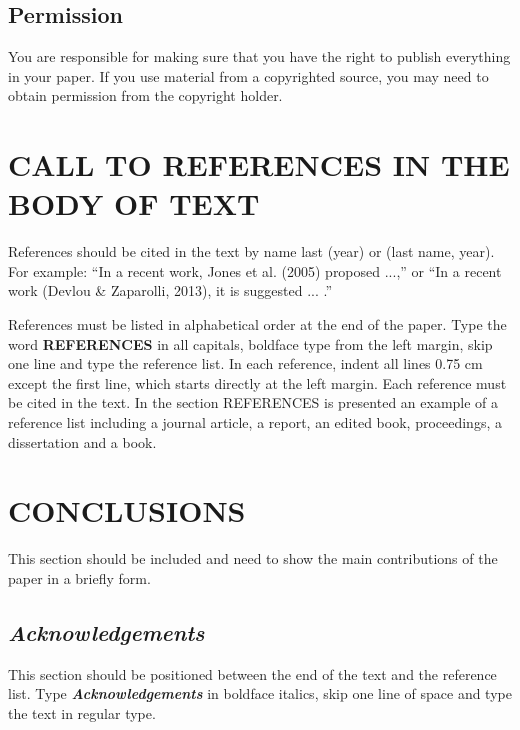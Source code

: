 \documentclass[12pt,fleqn]{article}
\begin{document}
\subsection{Permission}
You are responsible for making sure that you have the right to publish everything in your paper. If you use material from a copyrighted source, you may need to obtain permission from the copyright holder.

\section{CALL TO REFERENCES IN THE BODY OF TEXT}
References should be cited in the text by name last (year) or (last name, year). For example: ``In a recent work, Jones et al. (2005) proposed ...,'' or ``In a recent work (Devlou \& Zaparolli, 2013), it is suggested ... .''

References must be listed in alphabetical order at the end of the paper. Type the word \textbf{REFERENCES} in all capitals, boldface type from the left margin, skip one line and type the reference list. In each reference, indent all lines 0.75 cm except the first line, which starts directly at the left margin. Each reference must be cited in the text. In the section REFERENCES is presented an example of a reference list including a journal article, a report, an edited book, proceedings, a dissertation and a book.

\section{CONCLUSIONS}
This section should be included and need to show the main contributions of the paper in a briefly form.

\subsection*{\textit{Acknowledgements}}
This section should be positioned between the end of the text and the reference list. Type \textbf{\textit{Acknowledgements}} in boldface italics, skip one line of space and type the text in regular type.
\end{document}
